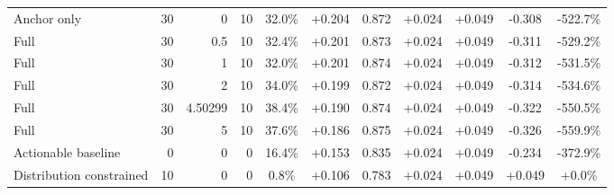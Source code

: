 \begin{table}[htbp]
\begin{tabular}{lrrrccccccc}
Anchor only & 30 & 0 & 10 & 32.0\% & +0.204 & 0.872 & +0.024 & +0.049 & -0.308 & -522.7\% \\
Full & 30 & 0.5 & 10 & 32.4\% & +0.201 & 0.873 & +0.024 & +0.049 & -0.311 & -529.2\% \\
Full & 30 & 1 & 10 & 32.0\% & +0.201 & 0.874 & +0.024 & +0.049 & -0.312 & -531.5\% \\
Full & 30 & 2 & 10 & 34.0\% & +0.199 & 0.872 & +0.024 & +0.049 & -0.314 & -534.6\% \\
Full & 30 & 4.50299 & 10 & 38.4\% & +0.190 & 0.874 & +0.024 & +0.049 & -0.322 & -550.5\% \\
Full & 30 & 5 & 10 & 37.6\% & +0.186 & 0.875 & +0.024 & +0.049 & -0.326 & -559.9\% \\
Actionable baseline & 0 & 0 & 0 & 16.4\% & +0.153 & 0.835 & +0.024 & +0.049 & -0.234 & -372.9\% \\
Distribution constrained & 10 & 0 & 0 & 0.8\% & +0.106 & 0.783 & +0.024 & +0.049 & +0.049 & +0.0\% \\
\bottomrule
\end{tabular}
\end{table}